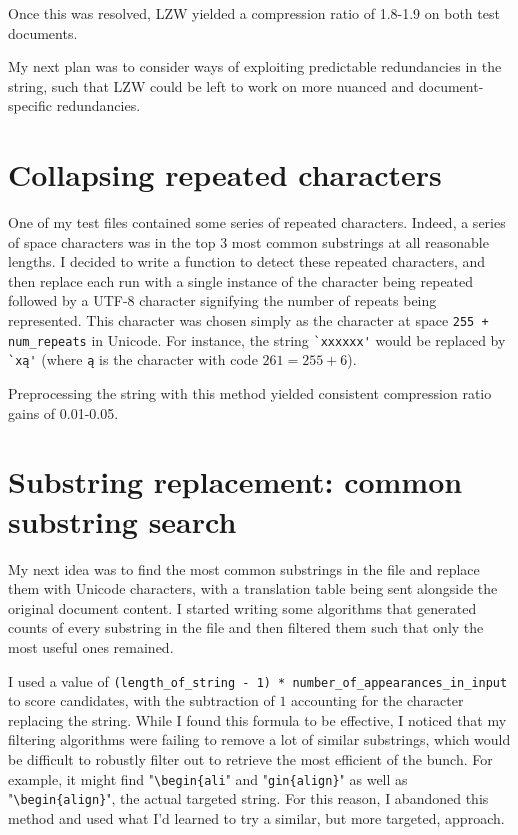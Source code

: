\documentclass[11pt]{article} %
\begin{document}
Once this was resolved, LZW yielded a compression ratio of 1.8-1.9 on both test documents.

My next plan was to consider ways of exploiting predictable redundancies in the string, such that LZW could be left to work on more nuanced and document-specific redundancies.

\section{Collapsing repeated characters}

One of my test files contained some series of repeated characters. Indeed, a series of space characters was in the top 3 most common substrings at all reasonable lengths. I decided to write a function to detect these repeated characters, and then replace each run with a single instance of the character being repeated followed by a UTF-8 character signifying the number of repeats being represented. This character was chosen simply as the character at space \verb|255 + num_repeats| in Unicode. For instance, the string \verb|`xxxxxx'| would be replaced by \verb|`xą'| (where \verb|ą| is the character with code $261 = 255 + 6$).

Preprocessing the string with this method yielded consistent compression ratio gains of 0.01-0.05.


\section{Substring replacement: common substring search} \label{commonSubstringSearch}

My next idea was to find the most common substrings in the file and replace them with Unicode characters, with a translation table being sent alongside the original document content. I started writing some algorithms that generated counts of every substring in the file and then filtered them such that only the most useful ones remained.

I used a value of \verb|(length_of_string - 1) * number_of_appearances_in_input| to score candidates, with the subtraction of $1$ accounting for the character replacing the string. While I found this formula to be effective, I noticed that my filtering algorithms were failing to remove a lot of similar substrings, which would be difficult to robustly filter out to retrieve the most efficient of the bunch. For example, it might find "\verb|\begin{ali|" and "\verb|gin{align}|" as well as "\verb|\begin{align}|", the actual targeted string. For this reason, I abandoned this method and used what I'd learned to try a similar, but more targeted, approach.
\end{document}
